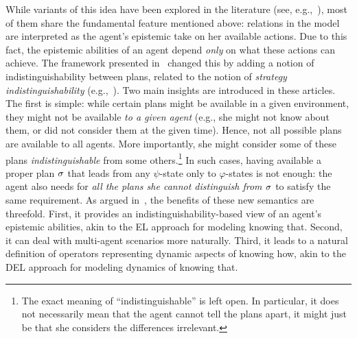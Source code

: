 While variants of this idea have been explored in the literature (see, e.g.,~\cite{Li17,LiWang17,FervariHLW17,Wang19a,LiW24}),
most of them share the fundamental feature mentioned above: relations in the model are interpreted as the agent's epistemic take on her available actions. Due to this fact, the epistemic abilities of an agent depend \emph{only} on what these actions can achieve. The framework presented in~\cite{AFSVQ21,AFSVQ23report} changed this by adding a notion of indistinguishability between plans, related to the notion of \emph{strategy indistinguishability} (e.g.,~\cite{JamrogaH04,Belardinelli14}). Two main insights are introduced in these articles. The first is simple: while certain plans might be available in a given environment, they might not be available \emph{to a given agent} (e.g., she might not know about them, or did not consider them at the given time). Hence, not all possible plans are available to all agents.  More importantly, she might consider some of these plans \emph{indistinguishable} from some others.\footnote{The exact meaning of ``indistinguishable'' is left open. In particular, it does not necessarily mean that the agent cannot tell the plans apart, it might just be that she considers the differences irrelevant.} In such cases, having available a proper plan $\sigma$ that leads from any $\psi$-state only to $\varphi$-states is not enough: the agent also needs for \emph{all the plans she cannot distinguish from $\sigma$} to satisfy the same requirement. 
As argued in~\cite{AFSVQ21}, the benefits of these new semantics are threefold. First, it provides an indistinguishability-based view of an agent's epistemic abilities, akin to the EL approach for modeling knowing that. Second, it can deal with multi-agent scenarios more naturally. Third, it leads to a natural definition of operators representing dynamic aspects of knowing how, akin to the DEL approach for modeling dynamics of knowing that.
%
